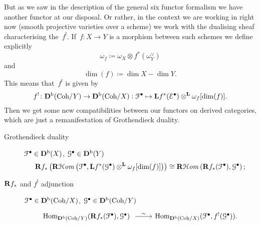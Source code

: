 \documentclass[10pt,a4paper]{article}
\begin{document}
But as we saw in the description of the general six functor formalism we have another functor at our disposal. Or rather, in the context we are working in right now (smooth projective varieties over a scheme) we work with the dualising sheaf characterising the~$f^!$. If~$f\colon X\to Y$ is a morphism between such schemes we define explicitly
\begin{equation}
  \omega_f\coloneqq\omega_X\otimes f^*(\omega_Y^\vee)
\end{equation}
and
\begin{equation}
  \dim(f)\coloneqq\dim X-\dim Y.
\end{equation}
This means that~$f^!$ is given by
\begin{equation}
  f^!\colon\mathbf{D}^{\mathrm{b}}(\mathrm{Coh}/Y)\to\mathbf{D}^{\mathrm{b}}(\mathrm{Coh}/X):\mathcal{F}^\bullet\mapsto\mathbf{L} f^*(\mathcal{E}^\bullet)\otimes^{\mathbf{L}}\omega_f[\dim(f)].
\end{equation}
Then we get some new compatibilities between our functors on derived categories, which are just a remanifestation of Grothendieck duality.
\begin{description}
  \item[Grothendieck duality] $\mathcal{F}^\bullet\in\mathbf{D}^{\mathrm{b}}(X)$, $\mathcal{G}^\bullet\in\mathbf{D}^{\mathrm{b}}(Y)$
    \begin{equation}
      \mathbf{R} f_*\left( \operatorname{\mathbf{R}\mathcal{H}\mathit{om}}\left( \mathcal{F}^\bullet,\mathbf{L} f^*(\mathcal{G}^\bullet)\otimes^{\mathbf{L}}\omega_f[\dim(f)] \right) \right)\cong\operatorname{\mathbf{R}\mathcal{H}\mathit{om}}\left( \mathbf{R} f_*(\mathcal{F}^\bullet),\mathcal{G}^\bullet \right);
    \end{equation}
  \item[$\mathbf{R} f_*$ and $f^!$ adjunction] $\mathcal{F}^\bullet\in\mathbf{D}^{\mathrm{b}}(\mathrm{Coh}/X)$, $\mathcal{G}^\bullet\in\mathbf{D}^{\mathrm{b}}(\mathrm{Coh}/Y)$
    \begin{equation}
      \begin{tikzcd}
        \Hom_{\derived^\bounded(\Coh/Y)}(\RRR f_*(\mathcal{F}^\bullet),\mathcal{G}^\bullet) \arrow{r}{\sim} & \Hom_{\derived^\bounded(\Coh/X)}(\mathcal{F}^\bullet,f^!(\mathcal{G}^\bullet)).
      \end{tikzcd}
    \end{equation}
\end{description}
\end{document}
